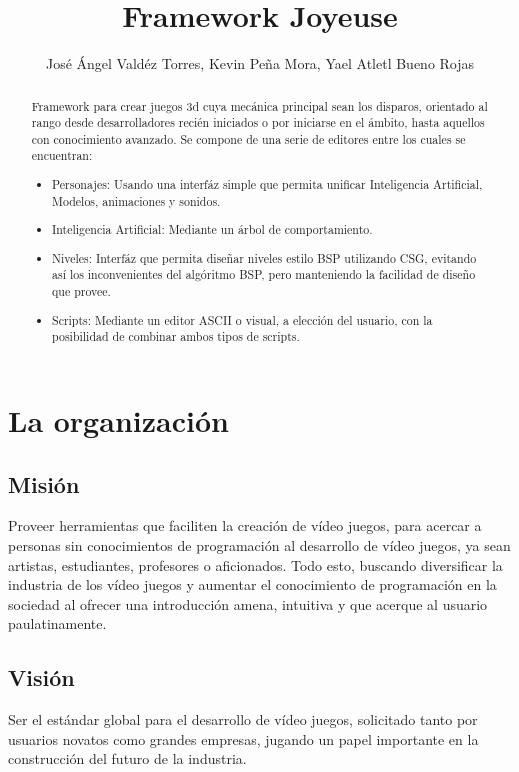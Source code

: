 \documentclass[]{article}
\title{Framework Joyeuse}
\author{Jos\'e \'Angel Vald\'ez Torres, Kevin Pe\~na Mora, Yael Atletl Bueno Rojas}
\begin{document}
\maketitle

\begin{abstract}
Framework para crear juegos 3d cuya mec\'anica principal sean los disparos, orientado al rango desde desarrolladores reci\'en iniciados o por iniciarse en el \'ambito, hasta aquellos con conocimiento avanzado. Se compone de una serie de editores entre los cuales se encuentran:
\begin{itemize}
	\item Personajes: Usando una interf\'az simple que permita unificar Inteligencia Artificial, Modelos, animaciones y sonidos. 
	\item Inteligencia Artificial: Mediante un \'arbol de comportamiento.
	\item Niveles: Interf\'az que permita dise\~nar niveles estilo BSP utilizando CSG, evitando as\'i los inconvenientes del alg\'oritmo BSP, pero manteniendo la facilidad de dise\~no que provee. 
	\item Scripts: Mediante un editor ASCII o visual, a elecci\'on del usuario, con la posibilidad de combinar ambos tipos de scripts. 
	
\end{itemize}

\end{abstract}
\newpage
\tableofcontents
\listoffigures
\newpage
\section{La organizaci\'on}


\subsection{Misi\'on}
Proveer herramientas que faciliten la creaci\'on de v\'ideo juegos, para acercar a personas sin conocimientos de programación al desarrollo de v\'ideo juegos, ya sean artistas, estudiantes, profesores o aficionados. Todo esto, buscando diversificar la industria de los v\'ideo juegos y aumentar el conocimiento de programaci\'on en la sociedad al ofrecer una introducci\'on amena, intuitiva y que acerque al usuario paulatinamente.



\subsection{Visi\'on} 
Ser el est\'andar global para el desarrollo de v\'ideo juegos, solicitado tanto por usuarios novatos como grandes empresas, jugando un papel importante en la construcci\'on del futuro de la industria. 
\end{document}
